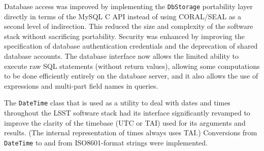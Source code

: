 Database access was improved by implementing the {\tt DbStorage}
portability layer directly in terms of the MySQL C API instead of using
CORAL/SEAL as a second level of indirection.  This reduced the size and
complexity of the software stack without sacrificing portability.
Security was enhanced by improving the specification of database
authentication credentials and the deprecation of shared database
accounts.  The database interface now allows the limited ability to
execute raw SQL statements (without return values), allowing some
computations to be done efficiently entirely on the database server, and
it also allows the use of expressions and multi-part field names in
queries.

The {\tt DateTime} class that is used as a utility to deal with dates and
times throughout the LSST software stack had its interface significantly
revamped to improve the clarity of the timebase (UTC or TAI) used for
its arguments and results.  (The internal representation of times always
uses TAI.)  Conversions from {\tt DateTime} to and from ISO8601-format
strings were implemented.

